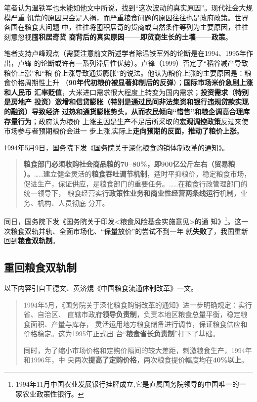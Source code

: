 笔者认为温铁军也未能如他文中所说，找到“这次波动的真实原因”。现代社会大规模严重
饥荒的原因只会是人祸，而严重粮食问题的原因往往也是政府政策。世界各国在粮食大问题
中，往往将囤积居奇的货商或自然条件等列为主要原因，往往刻意忽视\textbf{囤积居奇货
  商背后的真实原因——即货商生长的土壤——政策}。

笔者支持卢峰观点（需要注意前文所述学者除温铁军外的论断是在1994、1995年作出，卢锋
的论断或许有一系列滞后性优势）。卢锋（1999）否定了“稻谷减产导致粮价上涨”和“粮
价上涨导致通货膨胀”的说法。他认为粮价上涨的主要原因是：粮食价格周期性上升
（\textbf{90年代初粮价被显著抑制后的反弹}）；\textbf{国际市场米价急剧上涨和人民币
  汇率贬值}，大米进口需求很大程度上转变为国内需求；\textbf{投资需求（特别是房地产
  投资）激增和信贷膨胀（特别是通过民间非法集资和银行违规贷款实现的融资）导致经济
  过热和通货膨胀势头，从而农民倾向“惜售”和粮企调高合理库存量行为}；政府认为粮价
上涨主因是生产不足后所采取的\textbf{宏观调控政策}反过来使市场参与者预期粮价会进一
步上涨,实际上\textbf{走向预期的反面，推动了粮价上涨}。

1994年5月9日，国务院下发《国务院关于深化粮食购销体制改革的通知》。
\begin{quotation}
  \textbf{粮食部门必须收购社会商品粮的70--80\%，即900亿公斤左右（贸易粮
    ）。}……建立健全灵活的\textbf{粮食吞吐调节机制}，适时平抑粮价，稳定粮食市场，
  促进生产，保证供应，是粮食部门的重要任务。……在粮食行政管理部门的统一领导下，
  粮食经营实行\textbf{政策性业务和商业性经营两条线运行}机制，业务、机构、人员彻底
  分开。
\end{quotation}

同日，国务院下发《国务院关于印发<粮食风险基金实施意见>的通
知》\footnote{1994年11月中国农业发展银行挂牌成立,它是直属国务院领导的中国唯一的一
  家农业政策性银行。}。这一次粮食双轨并轨、全面市场化、“保量放价”的尝试不到一年
就\textbf{失败}了，我国重新回到\textbf{粮食双轨制}。


\subsection{重回粮食双轨制}

以下内容引自王德文、黄济焜《中国粮食流通体制改革》一文。
\begin{quotation}
  1994年5月，《国务院关于深化粮食购销改革的通知》进一步明确规定：实行省、自治区、
  直辖市政府\textbf{领导负责制}，负责本地区粮食总量平衡，稳定粮食面积、产量与库存，
  灵活运用地方粮食储备进行调节，保证粮食供应和价格稳定。这为1995年正式出
  台“\textbf{粮食省长负责制}”打下了基础。

  同时，为了缩小市场价格和定购价隔间的较大差距，刺激粮食生产，1994年和1996年，中
  央两次\textbf{提高了定购价格}，两次粮食提价幅度均在\textbf{40\%以上}。
\end{quotation}

